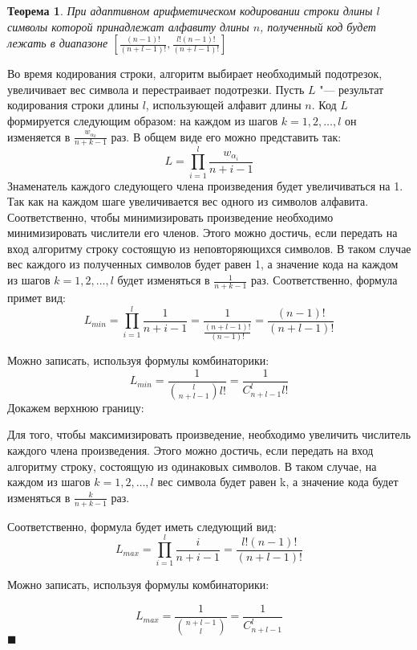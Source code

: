 \documentclass[12pt]{article}
\begin{document}
\newtheorem{Th}{Теорема}
\begin{Th}
При адаптивном арифметическом кодировании строки длины $l$ символы которой принадлежат алфавиту длины $n$, полученный код будет лежать в диапазоне $[\frac{(n-1)!}{(n+l-1)!}, \frac{l!(n-1)!}{(n+l-1)!}]$
\end{Th}
\newenvironment{Proof}
	{\par{}}
	{\hfill$\scriptstyle\blacksquare$}
\begin{Proof}
Во время кодирования строки, алгоритм выбирает необходимый подотрезок, увеличивает вес символа и перестраивает подотрезки.
Пусть $L$ "--- результат кодирования строки длины $l$, использующей алфавит длины $n$. Код $L$ формируется следующим образом: на каждом из шагов $k=1, 2, \dots, l$
он изменяется в $\frac{w_{\alpha_k}}{n+k-1}$ раз.
В общем виде его можно представить так:
\[
L = \prod_{i=1}^l \frac{w_{\alpha_i}}{n+i-1}
\]
Знаменатель каждого следующего члена произведения  будет увеличиваться на 1. Так как на каждом шаге увеличивается вес одного из символов алфавита.
Соответственно, чтобы минимизировать произведение необходимо минимизировать числители его членов.
Этого можно достичь, если передать на вход алгоритму строку состоящую из неповторяющихся символов.
В таком случае вес каждого из полученных символов будет равен 1, а значение кода на каждом из шагов $k=1, 2, \dots, l$ будет изменяться в $\frac{1}{n+k-1}$ раз.
Соответственно, формула примет вид:
\[
L_{min} = \prod_{i=1}^l \frac{1}{n+i-1} = \frac{1}{\frac{(n+l-1)!}{(n-1)!}} = \frac{(n-1)!}{(n+l-1)!}
\]

Можно записать, используя формулы комбинаторики:
\[
L_{min} = \frac{1}{{\binom{l}{n+l-1}}l!} = \frac{1}{C_{n+l-1}^{l}l!}
\]
Докажем верхнюю границу:

Для того, чтобы максимизировать произведение, необходимо увеличить числитель каждого члена произведения. Этого можно достичь, если передать на вход алгоритму строку, состоящую из одинаковых символов. В таком случае, на каждом из шагов $k=1, 2, \dots, l$ вес символа будет равен k, а значение кода будет изменяться в $\frac{k}{n+k-1}$ раз.

Соответственно, формула будет иметь следующий вид:
\[
L_{max} = \prod_{i=1}^l \frac{i}{n+i-1} = \frac{l!(n-1)!}{(n+l-1)!}
\]

Можно записать, используя формулы комбинаторики:

\[
L_{max} = \frac{1}{\binom{n+l-1}{l}} = \frac{1}{C_{n+l-1}^{l}}
\]
\end{Proof}
\end{document}
